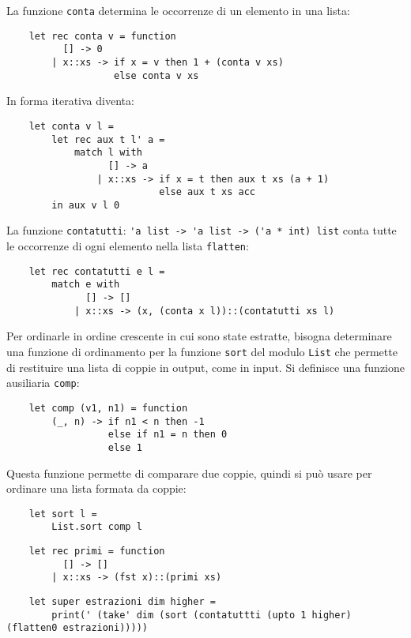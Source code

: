 \documentclass{article}
\numberwithin{equation}{subsection}
\begin{document}
La funzione \verb|conta| determina le occorrenze di un elemento in una lista:
\begin{verbatim}
    let rec conta v = function
          [] -> 0
        | x::xs -> if x = v then 1 + (conta v xs)
                   else conta v xs
\end{verbatim}
In forma iterativa diventa:
\begin{verbatim}
    let conta v l =
        let rec aux t l' a =
            match l with
                  [] -> a
                | x::xs -> if x = t then aux t xs (a + 1)
                           else aux t xs acc
        in aux v l 0
\end{verbatim}
La funzione \verb|contatutti|: \verb|'a list -> 'a list -> ('a * int) list| conta tutte le occorrenze di ogni elemento nella lista \verb|flatten|:
\begin{verbatim}
    let rec contatutti e l =
        match e with
              [] -> []
            | x::xs -> (x, (conta x l))::(contatutti xs l)
\end{verbatim}
Per ordinarle in ordine crescente in cui sono state estratte, bisogna determinare una funzione di ordinamento per la funzione \verb|sort| del modulo \verb|List| che permette di restituire una lista di coppie in output, come in input. Si definisce una funzione ausiliaria \verb|comp|:
\begin{verbatim}
    let comp (v1, n1) = function
        (_, n) -> if n1 < n then -1
                  else if n1 = n then 0
                  else 1
\end{verbatim}
Questa funzione permette di comparare due coppie, quindi si può usare per ordinare una lista formata da coppie:
\begin{verbatim}
    let sort l = 
        List.sort comp l
\end{verbatim}


\begin{verbatim}
    let rec primi = function
          [] -> []
        | x::xs -> (fst x)::(primi xs)
\end{verbatim}

\begin{verbatim}
    let super estrazioni dim higher =
        print(' (take' dim (sort (contatuttti (upto 1 higher) (flatten0 estrazioni)))))
\end{verbatim}

\end{document}

